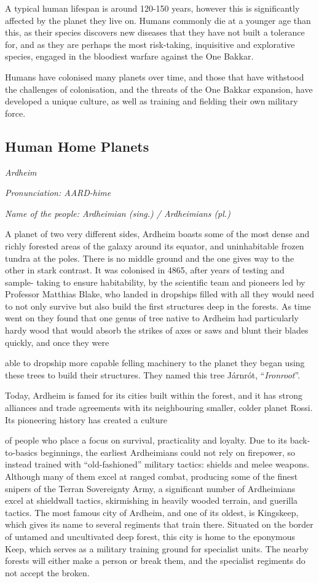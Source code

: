 \documentclass{scrbook}
\begin{document}
A typical human lifespan is around 120-150 years, however this is significantly affected by the planet they live on. Humans commonly die at a younger age than this, as their species discovers new diseases that they have not built a tolerance for, and as they are perhaps the most risk-taking, inquisitive and explorative species, engaged in the bloodiest warfare against the One Bakkar.

Humans have colonised many planets over time, and those that have withstood the challenges of colonisation, and the threats of the One Bakkar expansion, have developed a unique culture, as well as training and fielding their own military force.

\subsection{Human Home Planets}

\textit{Ardheim}

\textit{Pronunciation: AARD-hime}

\textit{Name of the people: Ardheimian (sing.) / Ardheimians (pl.)}

A planet of two very different sides, Ardheim boasts some of the most dense and richly forested areas of the galaxy around its equator, and uninhabitable frozen tundra at the poles. There is no middle ground and the one gives way to the other in stark contrast. It was colonised in 4865, after years of testing and sample- taking to ensure habitability, by the scientific team and pioneers led by Professor Matthias Blake, who landed in dropships filled with all they would need to not only survive but also build the first structures deep in the forests. As time went on they found that one genus of tree native to Ardheim had particularly hardy wood that would absorb the strikes of axes or saws and blunt their blades quickly, and once they were

able to dropship more capable felling machinery to the planet they began using these trees to build their structures. They named this tree J\'{a}rnr\'{o}t, ``\textit{Ironroot}''.

Today, Ardheim is famed for its cities built within the forest, and it has strong alliances and trade agreements with its neighbouring smaller, colder planet Rossi. Its pioneering history has created a culture

of people who place a focus on survival, practicality and loyalty. Due to its back-to-basics beginnings, the earliest Ardheimians could not rely on firepower, so instead trained with ``old-fashioned'' military tactics: shields and melee weapons. Although many of them excel at ranged combat, producing some of the finest snipers of the Terran Sovereignty Army, a significant number of Ardheimians excel at shieldwall tactics, skirmishing in heavily wooded terrain, and guerilla tactics. The most famous city of Ardheim, and one of its oldest, is Kingskeep, which gives its name to several regiments that train there. Situated on the border of untamed and uncultivated deep forest, this city is home to the eponymous Keep, which serves as a military training ground for specialist units. The nearby forests will either make a person or break them, and the specialist regiments do not accept the broken.
\end{document}
